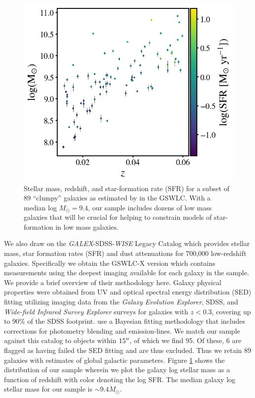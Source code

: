 \begin{figure}
\centering
\includegraphics[width=5in]{Figures/mass_z_sfr.png}
\caption[Stellar mass, redshift, and Star-formation rate for a subset of our ``clumpy'' galaxies as measured by the GSWLC.]{Stellar mass, redshift, and star-formation rate (SFR) for a subset of 89 ``clumpy'' galaxies as estimated by \cite{Salim2016} in the GSWLC. With a median log $M_{\odot}=9.4$, our sample includes dozens of low mass galaxies that will be crucial for helping to constrain models of star-formation in low mass galaxies.}
\label{fig: clumpy gswlc properties}
\end{figure}


We also draw on the \textit{GALEX}-SDSS-\textit{WISE} Legacy Catalog \citep[GSWLC,][]{Salim2016} which provides stellar mass, star formation rates (SFR) and dust attenuations for 700,000 low-redshift galaxies. Specifically we obtain the GSWLC-X version which contains measurements using the deepest imaging available for each galaxy in the sample. We provide a brief overview of their methodology here.  Galaxy physical properties were obtained from UV and optical spectral energy distribution (SED) fitting utilizing imaging data from the \textit{Galaxy Evolution Explorer}, SDSS, and \textit{Wide-field Infrared Survey Explorer} surveys for galaxies with $z<0.3$, covering up to 90\% of the SDSS footprint. \cite{Salim2016} use a Bayesian fitting methodology that includes corrections for photometry blending and emission-lines.  We match our sample against this catalog to objects within $15\mbox{$^{\prime\prime}$}$, of which we find 95. Of these, 6 are flagged as having failed the SED fitting and are thus excluded. Thus we retain 89 galaxies with estimates of global galactic parameters. Figure \ref{fig: clumpy gswlc properties} shows the distribution of our sample wherein we plot the galaxy log stellar mass as a function of redshift with color denoting the log SFR. The median galaxy log stellar mass for our sample is $\sim9.4 M_{\odot}$. 


